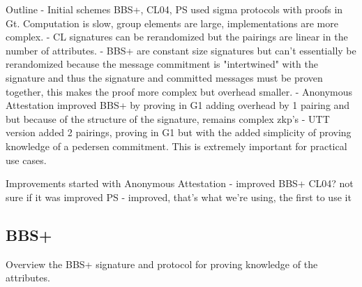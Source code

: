 {Outline
- Initial schemes BBS+, CL04, PS used sigma protocols with proofs in Gt. Computation is slow, group elements are large, implementations are more complex. 
- CL signatures can be rerandomized but the pairings are linear in the number of attributes. 
- BBS+ are constant size signatures but can't essentially be rerandomized because the message commitment is "intertwined" with the signature and thus the signature and committed messages must be proven together, this makes the proof more complex but overhead smaller.
- Anonymous Attestation improved BBS+ by proving in G1 adding overhead by 1 pairing and but because of the structure of the signature, remains complex zkp's
- UTT version added 2 pairings, proving in G1 but with the added simplicity of proving knowledge of a pedersen commitment. This is extremely important for practical use cases. 

Improvements started with
Anonymous Attestation - improved BBS+
CL04? not sure if it was improved
PS - improved, that's what we're using, the first to use it












\subsection{BBS+}
Overview the BBS+ signature and protocol for proving knowledge of the attributes.


}
